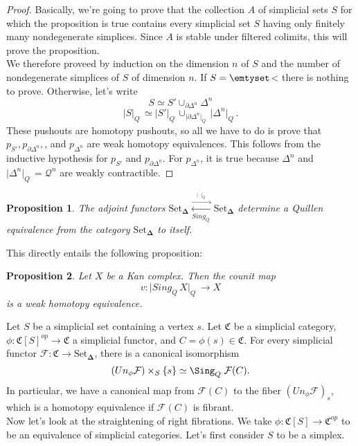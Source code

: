 \documentclass[12pt]{amsart}
\newcommand{\8}{\ensuremath{\infty}}
\newcommand{\C}{\ensuremath{\mathfrak{C}}}
\newcommand{\SSet}{\ensuremath{\text{Set}_{\boldsymbol{\Delta}}}}
\newcommand{\adj}[2]{\ensuremath{\overset{\overset{#1}{ \rightarrow}}{\underset{#2}{\leftarrow}}}}
\newtheorem{proposition}{Proposition}
\begin{document}
{{\begin{proof}
  Basically, we're going to prove that the collection $A$ of simplicial sets $S$ for which the proposition is true contains every simplicial set $S$ having only finitely many nondegenerate simplices. Since $A$ is stable under filtered colimits, this will prove the proposition. \\
  We therefore proveed by induction on the dimension $n$ of $S$ and the number of nondegenerate simplices of $S$ of dimension $n$. If $S=\emtyset$< there is nothing to prove. Otherwise, let's write $$S\simeq S'\displaystyle \cup_{\partial \Delta^n}\Delta^n$$
  $$\vert S\vert_{Q^\cdot}\simeq \vert S'\vert_{Q^\cdot}\displaystyle \cup_{\vert \partial \Delta^n\vert_{Q^\cdot}}\vert\Delta^n\vert_{Q^\cdot}.$$
  These pushouts are homotopy pushouts, so all we have to do is prove that $p_{S'}, p_{\partial\Delta^n},$, and $p_{\Delta^n}$ are weak homotopy equivalences. This follows from the inductive hypothesis for $p_{S'}$ and $p_{\partial\Delta^n}$. For $p_{\Delta^n}$, it is true because $\Delta^n$ and $\vert\Delta^n\vert_{Q^\cdot}=\mathscr{Q}^n$ are weakly contractible.
\end{proof}

\begin{proposition}
  The adjoint functors $\SSet\adj{\vert \cdot \vert_{Q^\cdot}}{Sing_{Q^\cdot}}\SSet$ determine a Quillen equivalence from the category $\SSet$ to itself.
\end{proposition}

This directly entails the following proposition:

\begin{proposition}
  Let $X$ be a Kan complex. Then the counit map\[v:\vert Sing_{Q^\cdot}X\vert_{Q^\cdot}\rightarrow X\] is a weak homotopy equivalence.
\end{proposition}

Let $S$ be a simplicial set containing a vertex $s$. Let $\C$ be a simplicial category, $\phi:\mathfrak{C}[S]^{op}\rightarrow \C$ a simplicial functor, and $C=\phi(s)\in\C$. For every simplicial functor $\mathcal{F}:\C\rightarrow \SSet$, there is a canonical isomorphism \[(Un_\phi\mathcal{F})\times_S\{s\}\simeq \Sing_{Q^\cdot}\mathcal{F}(C).\]
In particular, we have a canonical map from $\mathcal{F}(C)$ to the fiber $(Un_\phi\mathcal{F})_s$, which is a homotopy equivalence if $\mathcal{F}(C)$ is fibrant.\\

Now let's look at the straightening of right fibrations. We take $\phi:\mathfrak{C}[S]\rightarrow \C^{op}$ to be an equivalence of simplicial categories. Let's first consider $S$ to be a simplex.\\

}}
\end{document}
